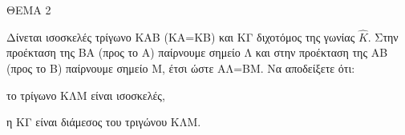 
ΘΕΜΑ 2

Δίνεται ισοσκελές τρίγωνο ΚΑΒ (ΚΑ=ΚΒ) και ΚΓ διχοτόμος της γωνίας $\widehat{K}$. Στην προέκταση της ΒΑ (προς το Α) παίρνουμε σημείο Λ και στην προέκταση της ΑΒ (προς το Β) παίρνουμε σημείο Μ, έτσι ώστε ΑΛ=ΒΜ. Να αποδείξετε ότι:

\begin{alist}
\item το τρίγωνο ΚΛΜ είναι ισοσκελές, 

\item η ΚΓ είναι διάμεσος του τριγώνου ΚΛΜ. 
\end{alist}
